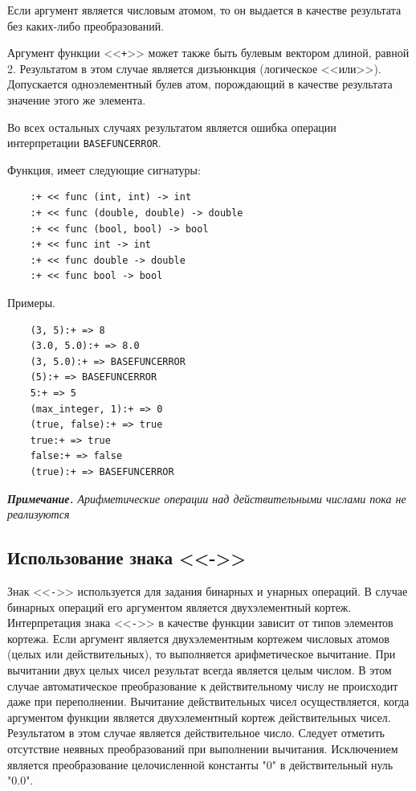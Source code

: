 Если аргумент является числовым атомом, то он выдается в качестве результата без каких-либо преобразований.

Аргумент функции <<\verb|+|>> может также быть булевым вектором длиной, равной 2. Результатом в этом случае является дизъюнкция (логическое <<или>>). Допускается одноэлементный булев атом, порождающий в качестве результата значение этого же элемента.

Во всех остальных случаях результатом является ошибка операции интерпретации \verb|BASEFUNCERROR|.

Функция, имеет следующие сигнатуры:
\begin{verbatim}
    :+ << func (int, int) -> int
    :+ << func (double, double) -> double
    :+ << func (bool, bool) -> bool
    :+ << func int -> int
    :+ << func double -> double
    :+ << func bool -> bool
\end{verbatim}

Примеры.
\begin{verbatim}
    (3, 5):+ => 8
    (3.0, 5.0):+ => 8.0
    (3, 5.0):+ => BASEFUNCERROR
    (5):+ => BASEFUNCERROR
    5:+ => 5
    (max_integer, 1):+ => 0
    (true, false):+ => true
    true:+ => true
    false:+ => false
    (true):+ => BASEFUNCERROR
\end{verbatim}

\textit{\textbf{Примечание.}
Арифметические операции над действительными числами пока не реализуются}

\subsection{Использование знака <<->>}

Знак <<\verb|-|>> используется для задания бинарных и унарных операций. В случае бинарных операций его аргументом является двухэлементный кортеж. Интерпретация знака <<\verb|-|>> в качестве функции зависит от типов элементов кортежа. Если аргумент является двухэлементным кортежем числовых атомов (целых или действительных), то выполняется арифметическое вычитание. При вычитании двух целых чисел результат всегда является целым числом. В этом случае автоматическое преобразование к действительному числу не происходит даже при переполнении. Вычитание действительных чисел осуществляется, когда аргументом функции является двухэлементный кортеж действительных чисел. Результатом в этом случае является действительное число. Следует отметить отсутствие неявных преобразований при выполнении вычитания. Исключением является преобразование целочисленной константы "0" в действительный нуль "0.0".

